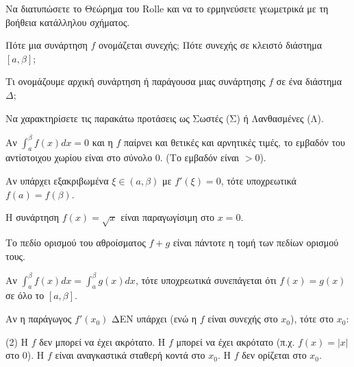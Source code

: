 \documentclass[11pt,a4paper]{article}
\newcommand{\kerkissans}[1]{{\fontfamily{maksf}\selectfont \textbf{#1}}}
\renewcommand{\textdexiakeraia}{}
\newcommand{\dint}{\displaystyle\int}
\newcommand\themanum{A}
\newcounter{thema}[section]
\renewcommand{\thethema}{\arabic{thema}}
\newcommand{\Thema}{\refstepcounter{thema}{\textbf{\textcolor{black}{\faPenSquare\ \  \large \kerkissans{\textbf{\thethemaο\hspace{2mm}Διαγώνισμα - Θέμα \themanum}}}}}\hspace{0mm}}{}
\newenvironment{thema}[1]
{\begin{tcolorbox}[title=\Thema\kerkissans{\textbf{\large{  #1}}},breakable,
enhanced standard,titlerule=0pt,toprule=0pt, rightrule=0pt, bottomrule=0pt,
colback=white,left=0mm,top=1mm,bottom=0mm,
boxrule=0pt,
colframe=white,leftrule=0mm,sharp corners,coltitle=black]
\renewcommand{\themanum}{#1}}
{\end{tcolorbox}}
\begin{document}
\begin{thema}{A}
\begin{erwthma}
    \item Να διατυπώσετε το Θεώρημα του Rolle και να το ερμηνεύσετε γεωμετρικά με τη βοήθεια κατάλληλου σχήματος.
    \item Πότε μια συνάρτηση $f$ ονομάζεται συνεχής; Πότε συνεχής σε κλειστό διάστημα $[a, \beta]$;
    \item Τι ονομάζουμε αρχική συνάρτηση ή παράγουσα μιας συνάρτησης $f$ σε ένα διάστημα $\Delta$;
    \item Να χαρακτηρίσετε τις παρακάτω προτάσεις ως Σωστές (Σ) ή Λανθασμένες (Λ).
    \begin{alist}
        \item Αν $\dint_a^\beta f(x) dx = 0$ και η $f$ παίρνει και θετικές και αρνητικές τιμές, το εμβαδόν του αντίστοιχου χωρίου είναι στο σύνολο 0. (Το εμβαδόν είναι $>0$).
        \item Αν υπάρχει εξακριβωμένα $\xi \in (a, \beta)$ με $f'(\xi)=0$, τότε υποχρεωτικά $f(a)=f(\beta)$.
        \item Η συνάρτηση $f(x) = \sqrt{x}$ είναι παραγωγίσιμη στο $x=0$.
        \item Το πεδίο ορισμού του αθροίσματος $f+g$ είναι πάντοτε η τομή των πεδίων ορισμού τους.
        \item Αν $\dint_a^\beta f(x) dx = \dint_a^\beta g(x) dx$, τότε υποχρεωτικά συνεπάγεται ότι $f(x) = g(x)$ σε όλο το $[a, \beta]$.
    \end{alist}
    \item Αν η παράγωγος $f'(x_0)$ ΔΕΝ υπάρχει (ενώ η $f$ είναι συνεχής στο $x_0$), τότε στο $x_0$:
    \begin{tasks}[label=\let\textdexiakeraia\relax\alph*.](2)
        \task Η $f$ δεν μπορεί να έχει ακρότατο.
        \task Η $f$ μπορεί να έχει ακρότατο (π.χ. $f(x)=|x|$ στο $0$).
        \task Η $f$ είναι αναγκαστικά σταθερή κοντά στο $x_0$.
        \task Η $f$ δεν ορίζεται στο $x_0$.
    \end{tasks}
\end{erwthma}
\end{thema}
\vspace{1cm}
\end{document}
